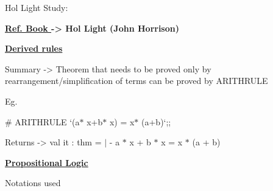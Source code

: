 \documentclass[12pt]{article}
\renewcommand{\_}{\kern-1.5pt\textunderscore\kern-1.5pt}
\begin{document}
\vspace{\baselineskip}

\vspace{\baselineskip}

\vspace{\baselineskip}

\vspace{\baselineskip}
\begin{FlushLeft}
{\fontsize{14pt}{16.8pt}\selectfont Hol Light Study:\par}
\end{FlushLeft}\par


\vspace{\baselineskip}

\vspace{\baselineskip}
\textbf{\uline{Ref. Book }-> Hol Light (John Horrison)}\par

\textbf{\uline{ }}\par

\textbf{\uline{Derived rules}}\par

Summary -> Theorem that needs to be proved only by rearrangement/simplification of terms can be proved by ARITH\_RULE\par

Eg. {\fontsize{14pt}{16.8pt}\selectfont $\#$  ARITH\_RULE `(a$\ast$ x+b$\ast$ x) = x$\ast$ (a+b)`;;\par}\par

{\fontsize{14pt}{16.8pt}\selectfont Returns -> val it : thm = $ \vert $ - a $\ast$  x + b $\ast$  x = x $\ast$  (a + b)\par}\par

{\fontsize{14pt}{16.8pt}\selectfont  \par}\par

{\fontsize{14pt}{16.8pt}\selectfont \textbf{\uline{Propositional Logic}}\par}\par

{\fontsize{14pt}{16.8pt}\selectfont Notations used\par}\par



\end{document}
